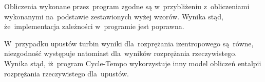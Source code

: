 Obliczenia wykonane przez~program zgodne są w~przybliżeniu
z~obliczeniami wykonanymi na~podstawie zestawionych wyżej wzorów.
Wynika stąd, że~implementacja zależności w~programie jest poprawna.

W~przypadku upustów turbin wyniki dla~rozprężania izentropowego
są~równe, niezgodność występuje natomiast dla~wyników rozprężania
rzeczywistego. Wynika stąd, iż~program Cycle-Tempo wykorzystuje inny
model obliczeń entalpii rozprężania rzeczywistego dla~upustów.
